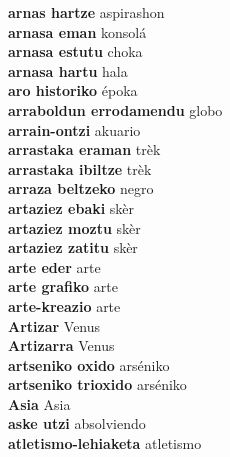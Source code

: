 \textbf{ arnas hartze  } aspirashon \\
\textbf{ arnasa eman  } konsolá \\
\textbf{ arnasa estutu  } choka \\
\textbf{ arnasa hartu  } hala \\
\textbf{ aro historiko  } époka \\
\textbf{ arraboldun errodamendu  } globo \\
\textbf{ arrain-ontzi  } akuario \\
\textbf{ arrastaka eraman  } trèk \\
\textbf{ arrastaka ibiltze  } trèk \\
\textbf{ arraza beltzeko  } negro \\
\textbf{ artaziez ebaki  } skèr \\
\textbf{ artaziez moztu  } skèr \\
\textbf{ artaziez zatitu  } skèr \\
\textbf{ arte eder  } arte \\
\textbf{ arte grafiko  } arte \\
\textbf{ arte-kreazio  } arte \\
\textbf{ Artizar  } Venus \\
\textbf{ Artizarra  } Venus \\
\textbf{ artseniko oxido  } arséniko \\
\textbf{ artseniko trioxido  } arséniko \\
\textbf{ Asia  } Asia \\
\textbf{ aske utzi  } absolviendo \\
\textbf{ atletismo-lehiaketa  } atletismo \\
